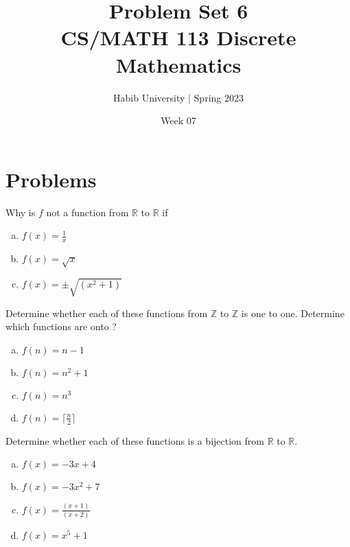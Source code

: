 \documentclass{article}
\newenvironment{problem}[2][Problem]{\begin{trivlist}
\item[\hskip \labelsep {\bfseries #1}\hskip \labelsep {\bfseries #2.}]}{\end{trivlist}}
\begin{document}
\title{Problem Set 6\\CS/MATH 113 Discrete Mathematics}
\author{Habib University | Spring 2023}
\date{Week 07}
\maketitle

\section{Problems}

\begin{problem}{1}[Chapter 2.3, Question 1]
Why is $f$ not a function from $\mathbb{R}$ to $\mathbb{R}$ if 
\begin{enumerate}[(a)]
    \item $ f(x) = \frac{1}{x}$
    \item $ f(x) = \sqrt{x}$
    \item $ f(x) = \pm  \sqrt{(x^2 + 1)}$
    
\end{enumerate}
\end{problem}

\begin{problem}{2}[Chapter 2.3, Question 12, 13]
Determine whether each of these functions from $\mathbb{Z}$ to $\mathbb{Z}$ is one to one. Determine which functions are onto ?
\begin{enumerate}[(a)]
    \item $f(n) = n - 1$
    \item $f(n) = n^2 + 1$
    \item $f(n) = n^3 $
    \item $f(n) = \lceil \frac{n}{2} \rceil $
\end{enumerate}
\end{problem}

\begin{problem}{3}[Chapter 2.3, Question 22]
Determine whether each of these functions is a bijection from $\mathbb{R}$ to $\mathbb{R}$.
    \begin{enumerate}[(a)]
        \item $f(x) = -3x + 4$
        \item $f(x) = -3x^2 + 7$
        \item $f(x) = \frac{(x+1)}{(x+2)} $
        \item $f(x) = x^5 + 1 $
\end{enumerate}
\end{problem}
\end{document}
